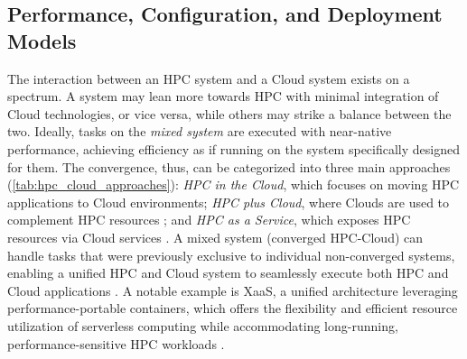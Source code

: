 

\subsection{Performance, Configuration, and Deployment Models}
\label{sec:perfconfiguration}


        The interaction between an HPC system and a Cloud system exists on a spectrum. A system may lean more towards HPC with minimal integration of Cloud technologies, or vice versa, while others may strike a balance between the two.  Ideally, tasks on the \textit{mixed system} are executed with near-native performance, achieving efficiency as if running on the system specifically designed for them. The convergence, thus, can be categorized into three main approaches (\autoref{tab:hpc_cloud_approaches}): \textit{HPC in the Cloud}, which focuses on moving HPC applications to Cloud environments; \textit{HPC plus Cloud}, where Clouds are used to complement HPC resources \cite{endo_consideration_2022, balis_scientific_2021, XaaS-torsten}; and \textit{HPC as a Service}, which exposes HPC resources via Cloud services \cite{netto_hpc_2018, liu_hpc_2022}. A mixed system (converged HPC-Cloud) can handle tasks that were previously exclusive to individual non-converged systems, enabling a unified HPC and Cloud system to seamlessly execute both HPC and Cloud applications \cite{gadban_analyzing_2022}. A notable example is XaaS, a unified architecture leveraging performance-portable containers, which offers the flexibility and efficient resource utilization of serverless computing while accommodating long-running, performance-sensitive HPC workloads \cite{XaaS-torsten}.

